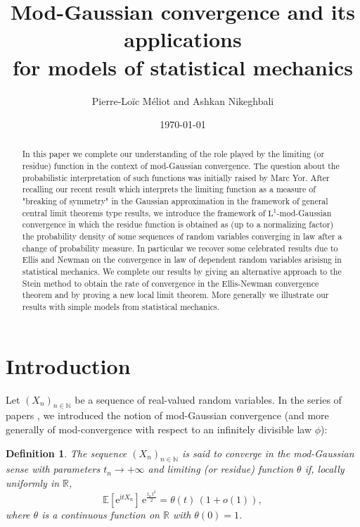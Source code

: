 \documentclass[12pt,a4paper,reqno]{amsart}
\title[Mod-Gaussian convergence and applications for models of statistical mechanics]{Mod-Gaussian convergence and its applications\\ for models of statistical mechanics}
\author{Pierre-Lo\"ic M\'eliot and Ashkan Nikeghbali}
\date{\today}
\newcommand{\N}{\mathbb{N}}
\newcommand{\R}{\mathbb{R}}
\newcommand{\E}{\mathrm{e}}
\newcommand{\I}{\mathrm{i}}
\newcommand{\esper}{\mathbb{E}}
\newtheorem{definition}[theorem]{Definition}
\theoremstyle{remark}
\begin{document}
\begin{abstract}
In this paper we complete our understanding of the role played by the limiting (or residue) function in the context of mod-Gaussian convergence. The question about the probabilistic interpretation of such functions was initially raised by Marc Yor. After recalling our recent result which interprets the limiting function as a measure of "breaking of symmetry" in the Gaussian approximation in the framework of general central limit theorems type results, we introduce the framework of $\mathrm{L}^1$-mod-Gaussian convergence in which the residue function is obtained as (up to a normalizing factor) the probability density of some sequences of random variables converging in law after a change of probability measure. In particular we recover some celebrated results due to Ellis and Newman on the convergence in law of dependent random variables arisisng in statistical mechanics. We complete our results by giving an alternative approach to the Stein method to obtain the rate of convergence in the Ellis-Newman convergence theorem and by proving a new local limit theorem. More generally we illustrate our results with simple models from statistical mechanics.
\end{abstract}

\maketitle

\begin{center}
\end{center}
\bigskip


\section{Introduction}

Let $(X_n)_{n \in \N}$ be a sequence of real-valued random variables. In the series of papers \cite{JKN11,DKN11,KN10,KN12,FMN13}, we introduced the notion of mod-Gaussian convergence (and more generally of mod-convergence with respect to an infinitely divisible law $\phi$):

\begin{definition}\label{def:mod}
The sequence $(X_n)_{n \in \N}$ is said to converge in the mod-Gaussian sense with parameters $t_n \to +\infty$ and limiting (or residue) function $\theta$ if, locally uniformly in $\R$,
$$\esper[\E^{\I t X_n}]\,\E^{\frac{t_n\,t^2}{2}} = \theta(t) \,(1+o(1)),$$
where $\theta$ is a continuous function on $\R$ with $\theta(0)=1$. 

\end{definition}
\end{document}
